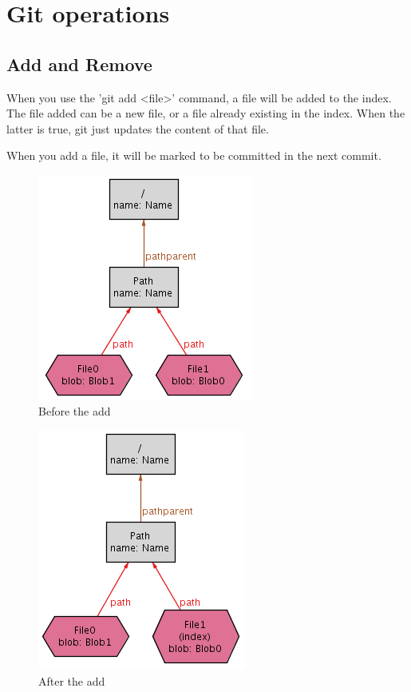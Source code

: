 \section{Git operations}

\subsection{Add and Remove}

When you use the 'git add <file>' command, a file will be
added to the index. The file added can be a new file, or 
a file already existing in the index. When the latter is true, 
git just updates the content of that file. \par
When you add a file, it will be marked to be committed in the next
commit. 
\begin{figure}[h!] 
	\caption{Before the add}
	\centering
	\includegraphics[scale=0.65]{images/add1.png}
\end{figure}

\begin{figure}[h!] 
	\caption{After the add}
	\centering
	\includegraphics[scale=0.65]{images/add2.png}
\end{figure}

